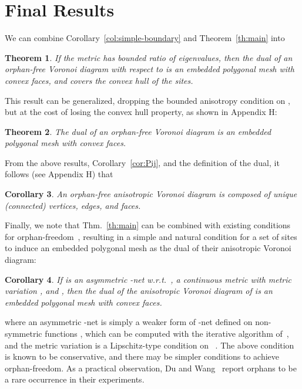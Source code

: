 \documentclass[11pt]{article}
\newtheorem{theorem}{Theorem}[section]
\newtheorem{corollary}[theorem]{Corollary}
\begin{document}
\section{Final Results}\label{sec:gen}


We can combine Corollary~\ref{col:simple-boundary} and Theorem~\ref{th:main} into
\begin{theorem}\label{gamma}
If the metric  has bounded ratio of eigenvalues, then the dual of an orphan-free Voronoi diagram with respect to  is an embedded polygonal mesh with convex faces, and covers the convex hull of the sites. 
\end{theorem}

This result can be generalized, dropping the bounded anisotropy condition on , but at the cost of losing the convex hull property, as shown in Appendix H:
\begin{theorem}\label{th:final}
The dual of an orphan-free Voronoi diagram is an embedded polygonal mesh with convex faces. 
\end{theorem}

From the above results, Corollary~\ref{cor:Pij}, and the definition of the dual, it follows (see Appendix H) that


\begin{corollary}\label{uniqueVD}
An orphan-free anisotropic Voronoi diagram is composed of unique (connected) vertices, edges, and faces.
\end{corollary}





Finally, we note that Thm.~\ref{th:main} can be combined with existing conditions for orphan-freedom~\cite{avd}, resulting in a simple and natural condition for a set of sites to induce an embedded polygonal mesh as the dual of their anisotropic Voronoi diagram:
\begin{corollary}\label{cor:enet}
	If  is an asymmetric -net w.r.t.\ ,  a continuous metric with metric variation , 
		and , then the dual of the anisotropic Voronoi diagram of 
		is an embedded polygonal mesh with convex faces.\end{corollary}
where an asymmetric -net is simply a weaker form of -net defined on non-symmetric functions , which can be computed with the iterative algorithm of~\cite{Gonz}, and the metric variation  is a Lipschitz-type condition  on ~\cite{avd}. 
The above condition is known to be conservative, and there may be simpler conditions to achieve orphan-freedom. As a practical observation, Du and Wang~\cite{DW} report orphans to be a rare occurrence in their experiments. 
\end{document}
